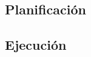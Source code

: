   
\subsection{Planificación}
 \label{sub:planificacion}
  
  
  
\subsection{Ejecución}
 \label{sub:ejecucion}
  
  
